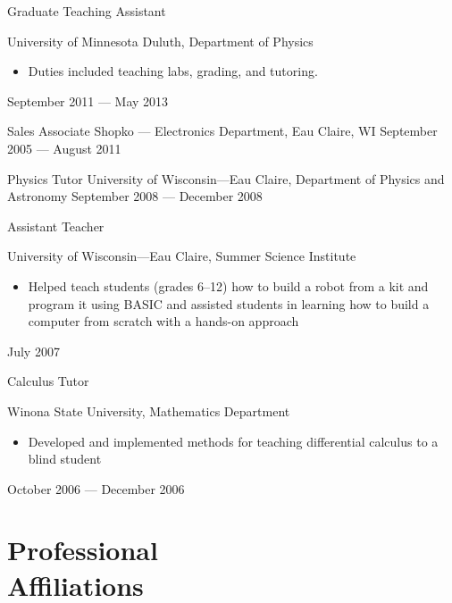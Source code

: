 \documentclass{cv}
\begin{document}
\begin{resume}
\object
{Graduate Teaching Assistant}
{University of Minnesota Duluth, Department of Physics \noemph
\begin{itemize}
		\item Duties included teaching labs, grading, and tutoring.
	\end{itemize}
 }
{September 2011 --- May 2013}


\object
{Sales Associate}
{Shopko --- Electronics Department, Eau Claire, WI}
{September 2005 --- August 2011}


\object
{Physics Tutor}
{University of Wisconsin---Eau Claire, Department of Physics and Astronomy}
{September 2008 --- December 2008}


\object
{Assistant Teacher}
{University of Wisconsin---Eau Claire, Summer Science Institute \noemph
\begin{itemize}
		\item Helped teach students (grades 6--12) how to build a robot from a kit and program it using BASIC and assisted students in learning how to build a computer from scratch with a hands-on approach
	\end{itemize}
 }
{July 2007}


\object
{Calculus Tutor}
{Winona State University, Mathematics Department \noemph
\begin{itemize}
		\item Developed and implemented methods for teaching differential calculus to a blind student
	\end{itemize}
 }
{October 2006 --- December 2006}


\newpage


\section{Professional \\ Affiliations}

 \\
\itemSep

 \\
\itemSep



\end{resume}
\end{document}
